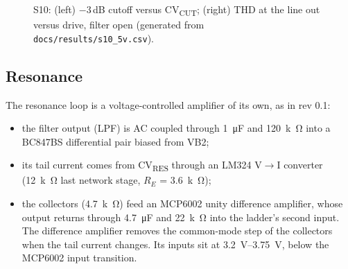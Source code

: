 \documentclass[11pt,a4paper]{article}
\newcommand{\file}[1]{\texttt{#1}}
\newcommand{\sub}[1]{\textsubscript{#1}}
\begin{document}
\begin{table}[htbp]
\centering\small
\caption{S10: the analog core at \SI{5}{V} against rev 0.1 (\file{docs/results/s10\_5v.csv}); generated. CV values
are fractions of the PWM full scale expressed on a \SI{5}{V} scale; drive levels are saw equivalents
(\SI{2}{V_{pp}} = full DAC scale).}\label{tab:s10}
\setlength{\tabcolsep}{4pt}

\end{table}

\begin{figure}[htbp]
\centering
\resizebox{\textwidth}{!}{}
\caption{S10: (left) $-3$\,dB cutoff versus CV\sub{CUT}; (right) THD at the line out versus drive, filter open
(generated from \file{docs/results/s10\_5v.csv}).}\label{fig:s10}
\end{figure}

\subsection{Resonance}
The resonance loop is a voltage-controlled amplifier of its own, as in rev 0.1:
\begin{itemize}
  \item the filter output (LPF) is AC coupled through \SI{1}{\micro F} and \SI{120}{k\ohm} into a BC847BS differential
    pair biased from VB2;
  \item its tail current comes from CV\sub{RES} through an LM324 V$\to$I converter (\SI{12}{k\ohm} last network stage,
    $R_E$ = \SI{3.6}{k\ohm});
  \item the collectors (\SI{4.7}{k\ohm}) feed an MCP6002 unity difference amplifier, whose output returns through
    \SI{4.7}{\micro F} and \SI{22}{k\ohm} into the ladder's second input. The difference amplifier removes the
    common-mode step of the collectors when the tail current changes. Its inputs sit at
    \SIrange{3.2}{3.75}{V}, below the MCP6002 input transition.
\end{itemize}
\end{document}
